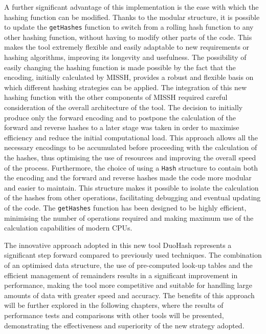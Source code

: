 A further significant advantage of this implementation is the ease with which the hashing function can be modified. Thanks to the modular structure, it is possible to update the \verb|getHashes| function to switch from a rolling hash function to any other hashing function, without having to modify other parts of the code. This makes the tool extremely flexible and easily adaptable to new requirements or hashing algorithms, improving its longevity and usefulness. The possibility of easily changing the hashing function is made possible by the fact that the encoding, initially calculated by \acs{MISSH}, provides a robust and flexible basis on which different hashing strategies can be applied. The integration of this new hashing function with the other components of \acs{MISSH} required careful consideration of the overall architecture of the tool. The decision to initially produce only the forward encoding and to postpone the calculation of the forward and reverse hashes to a later stage was taken in order to maximise efficiency and reduce the initial computational load. This approach allows all the necessary encodings to be accumulated before proceeding with the calculation of the hashes, thus optimising the use of resources and improving the overall speed of the process. Furthermore, the choice of using a \verb|Hash| structure to contain both the encoding and the forward and reverse hashes made the code more modular and easier to maintain. This structure makes it possible to isolate the calculation of the hashes from other operations, facilitating debugging and eventual updating of the code. The \verb|getHashes| function has been designed to be highly efficient, minimising the number of operations required and making maximum use of the calculation capabilities of modern CPUs.

The innovative approach adopted in this new tool DuoHash represents a significant step forward compared to previously used techniques. The combination of an optimised data structure, the use of pre-computed look-up tables and the efficient management of remainders results in a significant improvement in performance, making the tool more competitive and suitable for handling large amounts of data with greater speed and accuracy. The benefits of this approach will be further explored in the following chapters, where the results of performance tests and comparisons with other tools will be presented, demonstrating the effectiveness and superiority of the new strategy adopted.
